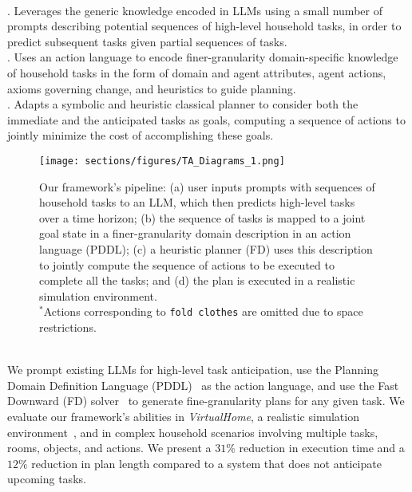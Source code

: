 \\. Leverages the generic knowledge encoded in LLMs using a small number of prompts describing potential sequences of high-level household tasks, in order to predict subsequent tasks given partial sequences of tasks.
\\. Uses an action language to encode finer-granularity domain-specific knowledge of household tasks in the form of domain and agent attributes, agent actions, axioms governing change, and heuristics to guide planning.
\\. Adapts a symbolic and heuristic classical planner to consider both the immediate and the anticipated tasks as goals, computing a sequence of actions to jointly minimize the cost of accomplishing these goals. 
\begin{figure*}[!htbp]
\centering
\captionsetup{font=scriptsize}
\setlength{\belowcaptionskip}{-10pt}
\texttt{[image: sections/figures/TA\_Diagrams\_1.png]}
\caption{Our framework's pipeline: (a) user inputs prompts with sequences of household tasks to an LLM, which then predicts high-level tasks over a time horizon; (b) the sequence of tasks is mapped to a joint goal state in a finer-granularity domain description in an action language (PDDL); (c) a heuristic planner (FD) uses this description to jointly compute the sequence of actions to be executed to complete all the tasks; and (d) the plan is executed in a realistic simulation environment.\\$^*$Actions corresponding to \texttt{fold clothes} are omitted due to space restrictions.}
\label{fig:pipeline}
\end{figure*}
\\\indent We prompt existing LLMs for high-level task anticipation, use the Planning Domain Definition Language (PDDL)~\cite{pddl} as the action language, and use the Fast Downward (FD) solver~\cite{Helmert_2006} to generate fine-granularity plans for any given task. We evaluate our framework's abilities in \emph{VirtualHome}, a realistic simulation environment~\cite{puig2018virtualhome}, and in complex household scenarios involving multiple tasks, rooms, objects, and actions. We present a $31\%$ reduction in execution time and a $12\%$ reduction in plan length compared to a system that does not anticipate upcoming tasks.

